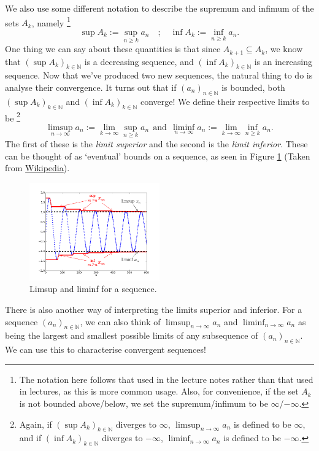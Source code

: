 \documentclass[
  10pt,
  a4paper]{article}
\theoremstyle{plain}
\theoremstyle{plain}
\theoremstyle{plain}
\theoremstyle{plain}
\theoremstyle{plain}
\theoremstyle{definition}
\theoremstyle{definition}
\theoremstyle{definition}
\theoremstyle{remark}
\begin{document}
We also use some different notation to describe the supremum and infimum of the sets \(A_k\), namely \footnote{The notation here follows that used in the lecture notes rather than that used in lectures, as this is more common usage. Also, for convenience, if the set \(A_k\) is not bounded above/below, we set the supremum/infimum to be \(\infty\)/\(-\infty\).} \[\sup A_k := \sup_{n\geq k}a_n \quad ; \quad \inf A_k := \inf_{n \geq k}a_n.\] One thing we can say about these quantities is that since \(A_{k+1} \subseteq A_k\), we know that \((\sup A_k)_{k\in\mathbb{N}}\) is a decreasing sequence, and \((\inf A_k)_{k\in\mathbb{N}}\) is an increasing sequence. Now that we've produced two new sequences, the natural thing to do is analyse their convergence. It turns out that if \((a_n)_{n\in\mathbb{N}}\) is bounded, both \((\sup A_k)_{k\in\mathbb{N}}\) and \((\inf A_k)_{k\in\mathbb{N}}\) converge! We define their respective limits to be \footnote{Again, if \((\sup A_k)_{k\in\mathbb{N}}\) diverges to \(\infty\), \(\limsup_{n \to \infty} a_n\) is defined to be \(\infty\), and if \((\inf A_k)_{k\in\mathbb{N}}\) diverges to \(-\infty\), \(\liminf_{n \to \infty} a_n\) is defined to be \(-\infty\).} \[\limsup_{n \to \infty} a_n := \lim_{k\to\infty}\sup_{n\geq k}a_n \;\, \text{and} \;\, \liminf_{n \to \infty} a_n := \lim_{k\to\infty}\inf_{n\geq k}a_n.\] The first of these is the \emph{limit superior} and the second is the \emph{limit inferior}. These can be thought of as `eventual' bounds on a sequence, as seen in Figure \ref{fig:limsup} (Taken from \href{https://en.wikipedia.org/wiki/Limit_inferior_and_limit_superior}{Wikipedia}).

\begin{figure}
\centering
\includegraphics[width=0.5\textwidth,height=\textheight]{Lim_sup_example_5.png}
\caption{\label{fig:limsup} Limsup and liminf for a sequence.}
\end{figure}

There is also another way of interpreting the limits superior and inferior. For a sequence \((a_n)_{n\in\mathbb{N}}\), we can also think of \(\limsup_{n\to\infty} a_n\) and \(\liminf_{n \to \infty}a_n\) as being the largest and smallest possible limits of any subsequence of \((a_n)_{n\in\mathbb{N}}\). We can use this to characterise convergent sequences!
\end{document}
